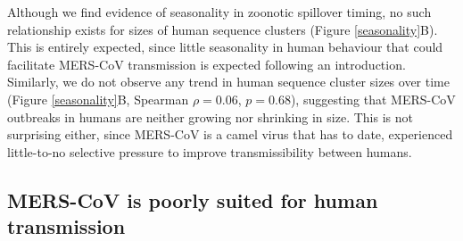 \documentclass[11pt,oneside,letterpaper]{article}
\begin{document}
Although we find evidence of seasonality in zoonotic spillover timing, no such relationship exists for sizes of human sequence clusters (Figure \ref{seasonality}B).
This is entirely expected, since little seasonality in human behaviour that could facilitate MERS-CoV transmission is expected following an introduction.
Similarly, we do not observe any trend in human sequence cluster sizes over time (Figure \ref{seasonality}B, Spearman $\rho = 0.06$, $p=0.68$), suggesting that MERS-CoV outbreaks in humans are neither growing nor shrinking in size.
This is not surprising either, since MERS-CoV is a camel virus that has to date, experienced little-to-no selective pressure to improve transmissibility between humans.


\subsection*{MERS-CoV is poorly suited for human transmission}
\end{document}
